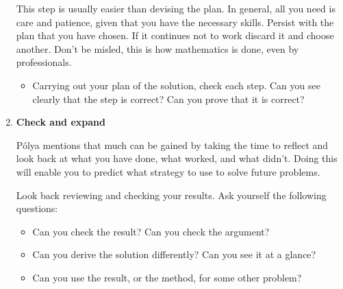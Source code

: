\documentclass[10pt,a4 paper]{extreport}
\begin{document}
\begin{enumerate}
This step is usually easier than devising the plan. In general, all you need is care and patience, given that you have the necessary skills. Persist with the plan that you have chosen. If it continues not to work discard it and choose another. Don't be misled, this is how mathematics is done, even by professionals.

\begin{itemize}
\item Carrying out your plan of the solution, check each step. Can you see clearly that the step is correct? Can you prove that it is correct?
\end{itemize}

\item \textbf{Check and expand}

P\'{o}lya mentions that much can be gained by taking the time to reflect and look back at what you have done, what worked, and what didn't. Doing this will enable you to predict what strategy to use to solve future problems.

Look back reviewing and checking your results. Ask yourself the following questions:
\begin{itemize}
\item Can you check the result? Can you check the argument?
\item Can you derive the solution differently? Can you see it at a glance?
\item Can you use the result, or the method, for some other problem?
\end{itemize}
\end{enumerate}
\pagebreak
\end{document}

